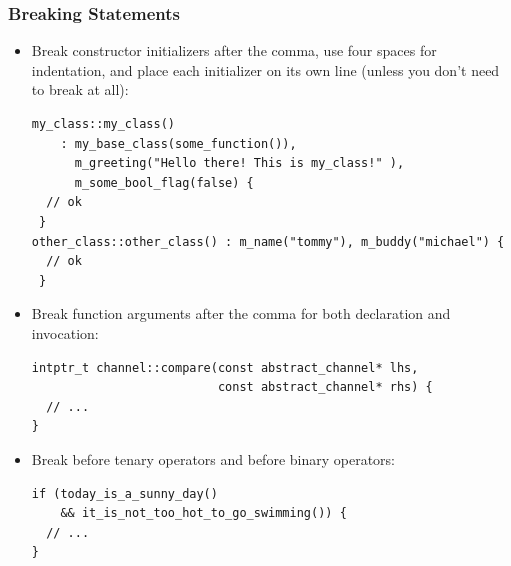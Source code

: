 \documentclass[oneside,a4paper,titlepage]{scrartcl} %
\begin{document}
\subsubsection{Breaking Statements}
\begin{itemize}
 \item Break constructor initializers after the comma, use four spaces for indentation, and place each
 initializer on its own line (unless you don't need to break at all):
 \begin{lstlisting}
my_class::my_class()
    : my_base_class(some_function()),
      m_greeting("Hello there! This is my_class!" ),
      m_some_bool_flag(false) {
  // ok
 }
other_class::other_class() : m_name("tommy"), m_buddy("michael") {
  // ok
 }
 \end{lstlisting}
 \item Break function arguments after the comma for both declaration and invocation:
 \begin{lstlisting}
intptr_t channel::compare(const abstract_channel* lhs,
                          const abstract_channel* rhs) {
  // ...
}
 \end{lstlisting}
 \item Break before tenary operators and before binary operators:
 \begin{lstlisting}
if (today_is_a_sunny_day()
    && it_is_not_too_hot_to_go_swimming()) {
  // ...
}
 \end{lstlisting}
\end{itemize}
\end{document}
